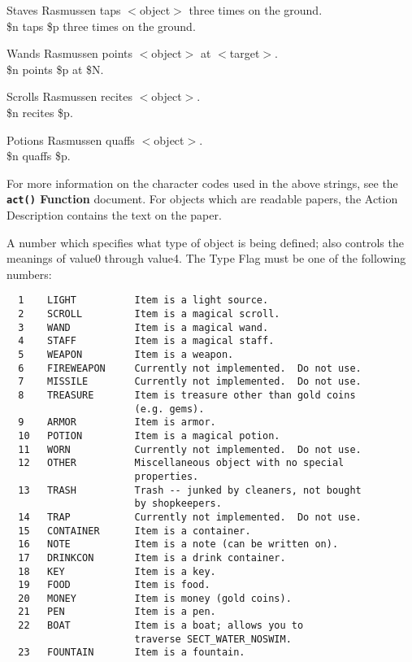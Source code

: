\documentclass[11pt]{article}
\newenvironment{Ventry}[1]
  {\begin{list}{}{\renewcommand{\makelabel}[1]{\textsf{##1:}\hfil}
    \settowidth{\labelwidth}{\textsf{#1:}}
    \setlength{\leftmargin}{\labelwidth}
    \addtolength{\leftmargin}{\labelsep}
  }
  }
  {\end{list}}
\begin{document}
\begin{description}
\begin{Ventry}{Potions}
\item[Staves]  Rasmussen taps $<$object$>$ three times on the ground.\\
  \$n taps \$p three times on the ground.
\item[Wands] Rasmussen points $<$object$>$ at $<$target$>$.\\
  \$n points \$p at \$N.
\item[Scrolls] Rasmussen recites $<$object$>$.\\
  \$n recites \$p.
\item[Potions] Rasmussen quaffs $<$object$>$.\\
  \$n quaffs \$p.
\end{Ventry}
For more information on the character codes used in the above strings, see the {\bf \texttt{act()} Function} document. For objects which are readable papers, the Action Description contains the text on the paper.
\item[Type Flag] A number which specifies what type of object is being defined; also controls the meanings of value0 through value4.  The Type Flag must be one of the following numbers:
\begin{verbatim}
  1    LIGHT          Item is a light source.
  2    SCROLL         Item is a magical scroll.
  3    WAND           Item is a magical wand.
  4    STAFF          Item is a magical staff.
  5    WEAPON         Item is a weapon.
  6    FIREWEAPON     Currently not implemented.  Do not use.
  7    MISSILE        Currently not implemented.  Do not use.
  8    TREASURE       Item is treasure other than gold coins
                      (e.g. gems).
  9    ARMOR          Item is armor.
  10   POTION         Item is a magical potion.
  11   WORN           Currently not implemented.  Do not use.
  12   OTHER          Miscellaneous object with no special
                      properties.
  13   TRASH          Trash -- junked by cleaners, not bought
                      by shopkeepers.
  14   TRAP           Currently not implemented.  Do not use.
  15   CONTAINER      Item is a container.
  16   NOTE           Item is a note (can be written on).
  17   DRINKCON       Item is a drink container.
  18   KEY            Item is a key.
  19   FOOD           Item is food.
  20   MONEY          Item is money (gold coins).
  21   PEN            Item is a pen.
  22   BOAT           Item is a boat; allows you to
                      traverse SECT_WATER_NOSWIM.
  23   FOUNTAIN       Item is a fountain.
\end{verbatim}

\end{description}
\end{document}
